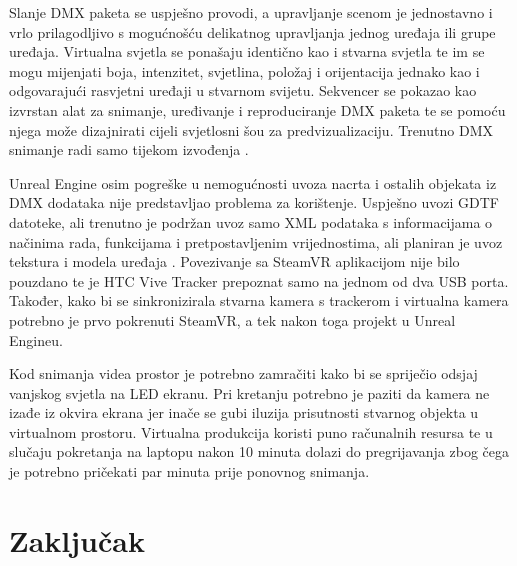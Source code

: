 \documentclass[times, utf8, zavrsni, numeric]{fer}
\begin{document}
Slanje DMX paketa se uspješno provodi, a upravljanje scenom je jednostavno i vrlo prilagodljivo s mogućnošću delikatnog upravljanja jednog uređaja ili grupe uređaja. Virtualna svjetla se ponašaju identično kao i stvarna svjetla te im se mogu mijenjati boja, intenzitet, svjetlina, položaj i orijentacija jednako kao i odgovarajući rasvjetni uređaji u stvarnom svijetu. Sekvencer se pokazao kao izvrstan alat za snimanje, uređivanje i reproduciranje DMX paketa te se pomoću njega može dizajnirati cijeli svjetlosni šou za predvizualizaciju. Trenutno DMX snimanje radi samo tijekom izvođenja \cite{dmx_tracks}. \newline

Unreal Engine osim pogreške u nemogućnosti uvoza nacrta i ostalih objekata iz DMX dodataka nije predstavljao problema za korištenje. Uspješno uvozi GDTF datoteke, ali trenutno je podržan uvoz samo XML podataka s informacijama o načinima rada, funkcijama i pretpostavljenim vrijednostima, ali planiran je uvoz tekstura i modela uređaja \cite{dmx_gdtf}. Povezivanje sa SteamVR aplikacijom nije bilo pouzdano te je HTC Vive Tracker prepoznat samo na jednom od dva USB porta. Također, kako bi se sinkronizirala stvarna kamera s trackerom i virtualna kamera potrebno je prvo pokrenuti SteamVR, a tek nakon toga projekt u Unreal Engineu. \newline

Kod snimanja videa prostor je potrebno zamračiti kako bi se spriječio odsjaj vanjskog svjetla na LED ekranu. Pri kretanju potrebno je paziti da kamera ne izađe iz okvira ekrana jer inače se gubi iluzija prisutnosti stvarnog objekta u virtualnom prostoru. Virtualna produkcija koristi puno računalnih resursa te u slučaju pokretanja na laptopu nakon 10 minuta dolazi do pregrijavanja zbog čega je potrebno pričekati par minuta prije ponovnog snimanja.

\chapter{Zaključak}

\raggedright


\end{document}
